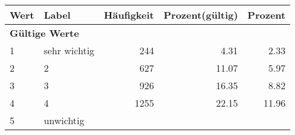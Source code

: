      \begin{longtable}{lXrrr}
     \toprule
     \textbf{Wert} & \textbf{Label} & \textbf{Häufigkeit} & \textbf{Prozent(gültig)} & \textbf{Prozent} \\
     \endhead
     \midrule
     \multicolumn{5}{l}{\textbf{Gültige Werte}}\\

     1 &
     \multicolumn{1}{X}{ sehr wichtig   } &


       \num{244} &
       \num[round-mode=places,round-precision=2]{4,31} &
         \num[round-mode=places,round-precision=2]{2,33} \\

     2 &
     \multicolumn{1}{X}{ 2   } &


       \num{627} &
       \num[round-mode=places,round-precision=2]{11,07} &
         \num[round-mode=places,round-precision=2]{5,97} \\

     3 &
     \multicolumn{1}{X}{ 3   } &


       \num{926} &
       \num[round-mode=places,round-precision=2]{16,35} &
         \num[round-mode=places,round-precision=2]{8,82} \\

     4 &
     \multicolumn{1}{X}{ 4   } &


       \num{1255} &
       \num[round-mode=places,round-precision=2]{22,15} &
         \num[round-mode=places,round-precision=2]{11,96} \\

     5 &
     \multicolumn{1}{X}{ unwichtig   } &



\end{longtable}
